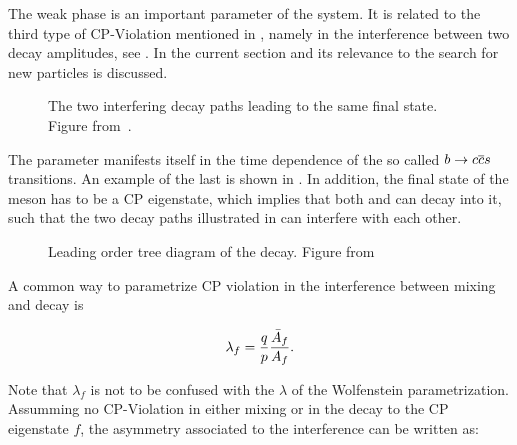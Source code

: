 The weak phase \phis is an important parameter of the \BBbarSyst system. It is related to the third
type of CP-Violation mentioned in , namely in the interference between
two decay amplitudes, see . In the current section \phis and its relevance to
the search for new particles is discussed.

\newcommand{\ffig}{f}
\newcommand{\phimixfig}{\phi_\text{mix}}
\newcommand{\phifig}{\phi_\text{dec}}
\newcommand{\phibarfig}{\kern 0.15em \overline{\kern -0.15em \phi_\text{dec} \kern -0.60em} \kern 0.60em}
\begin{figure}[h]
  \centering
  \resizebox{0.4\textwidth}{!}{}
  \caption{The two interfering decay paths leading to the same final state. Figure from~\cite{jeroenThesis}.}
  \label{interference}
\end{figure}

The parameter \phis manifests itself in the time dependence of the so called $b \rightarrow c\overline {c}s $ transitions.
An example of the last is shown in . In addition, the final state of the \Bs meson has to be
a CP eigenstate, which implies that both \Bs and \Bsb can decay into it, such that the two decay paths
illustrated in  can interfere with each other.

\begin{figure}[!h]
  \centering
  {\sffamily }
  \caption{Leading order tree diagram of the \BsJpsiPhi decay. Figure from~\cite{jeroenThesis}}
  \label{bs2jpsiphi}
\end{figure}

A common way to parametrize CP violation in the interference between mixing and decay is

\begin{equation}
  \centering
  \lambda_{f} = \frac{q}{p} \frac{\bar{A}_f}{A_f}. %
\label{lambda_cpv}
\end{equation}

\noindent Note that $\lambda_f$ is not to be confused with the $\lambda$ of the Wolfenstein parametrization.
Assumming no CP-Violation in either \BBbarSyst mixing or in the decay to the CP eigenstate $f$, the asymmetry
associated to the interference can be written as:


